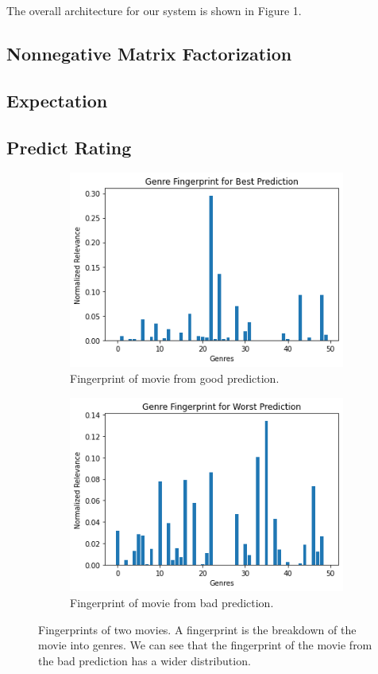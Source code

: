 \documentclass[letterpaper, 10 pt, conference]{ieeeconf}  %
\begin{document}
The overall architecture for our system is shown in Figure 1.

\subsection{Nonnegative Matrix Factorization}
\subsection{Expectation}
\subsection{Predict Rating}

\begin{figure}[h]
   \begin{subfigure}[b]{\columnwidth}
      \includegraphics[width=\linewidth]{./figs/bestfingerprint.png}
      \caption{Fingerprint of movie from good prediction.}
   \end{subfigure}
   \hfill
   \begin{subfigure}[b]{\columnwidth}
      \includegraphics[width=\linewidth]{./figs/worstfingerprint.png}
      \caption{Fingerprint of movie from bad prediction.}
   \end{subfigure}
   \caption{Fingerprints of two movies. A fingerprint is the breakdown of the movie into genres. We can see that the fingerprint of the movie from the bad prediction has a wider distribution.}
\end{figure}
\end{document}
